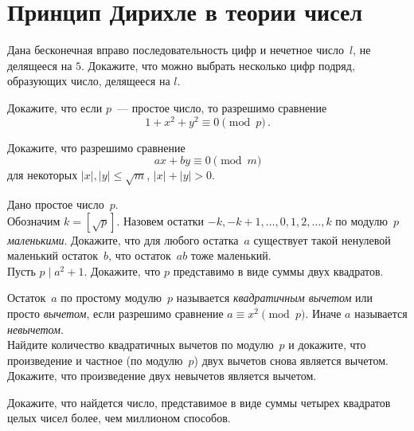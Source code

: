 
\section*{Принцип Дирихле в теории чисел}


\begin{problems}

\item
Дана бесконечная вправо последовательность цифр и нечетное число~$l$,
не делящееся на $5$.
Докажите, что можно выбрать несколько цифр подряд, образующих число, делящееся
на $l$. 

\item
Докажите, что если $p$~--- простое число, то разрешимо сравнение
\[
    1 + x^2 + y^2 \equiv 0 \pmod{p}
\,.\]

\item
Докажите, что разрешимо сравнение
\[
    a x + b y \equiv 0 \pmod{m}
\]
для некоторых $|x|, |y| \leq \sqrt{m}$, $|x| + |y| > 0$.
 
\item
Дано простое число~$p$.
\\
\subproblem
Обозначим $k = [\sqrt{p}]$.
Назовем остатки $- k, - k + 1, \ldots, 0, 1, 2, \ldots, k$ по модулю~$p$
\emph{маленькими}.
Докажите, что для любого остатка~$a$ существует такой ненулевой маленький
остаток~$b$, что остаток~$a b$ тоже маленький.
\\
\subproblem
Пусть $p \mid a^2 + 1$.
Докажите, что $p$ представимо в виде суммы двух квадратов.


\item
Остаток~$a$ по простому модулю~$p$ называется \emph{квадратичным вычетом} или
просто \emph{вычетом}, если разрешимо сравнение $a \equiv x^2 \pmod{p}$.
Иначе $a$ называется \emph{невычетом}.
\\
\subproblem
Найдите количество квадратичных вычетов по модулю~$p$ и докажите, что
произведение и частное (по модулю~$p$) двух вычетов снова является вычетом.
\\
\subproblem
Докажите, что произведение двух невычетов является вычетом.

\item
Докажите, что найдется число, представимое в виде суммы четырех квадратов целых
чисел более, чем миллионом способов.

\end{problems}


